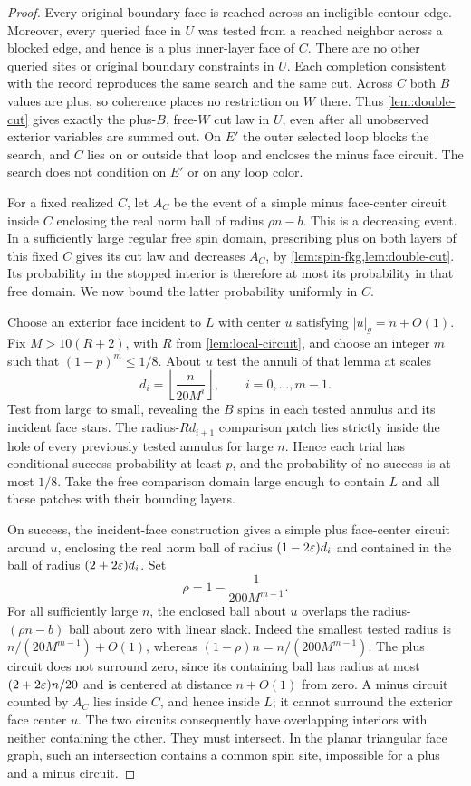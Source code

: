 \begin{proof}
Every original boundary face is reached across an ineligible contour
edge.  Moreover, every queried face in $U$ was tested from a reached
neighbor across a blocked edge, and hence is a plus inner-layer face of
$C$.  There are no other queried sites or original boundary constraints
in $U$.  Each completion consistent with the record reproduces the same
search and the same cut.  Across $C$ both $B$ values are plus, so coherence
places no restriction on $W$ there.  Thus \cref{lem:double-cut} gives
exactly the plus-$B$, free-$W$ cut law in $U$, even after all unobserved
exterior variables are summed out.  On $E'$ the outer selected loop
blocks the search, and $C$ lies on or outside that loop and encloses the
minus face circuit.
The search does not condition on $E'$ or on any loop color.

For a fixed realized $C$, let $A_C$ be the event of a simple minus
face-center circuit inside $C$ enclosing the real norm ball of radius
$\rho n-b$.  This is a decreasing event.  In a sufficiently large
regular free spin domain, prescribing plus on both layers of this fixed
$C$ gives its cut law and decreases $A_C$, by
\cref{lem:spin-fkg,lem:double-cut}.  Its probability in the stopped
interior is therefore at most its probability in that free domain.
We now bound the latter probability uniformly in $C$.

Choose an exterior face incident to $L$ with center $u$ satisfying
$|u|_g=n+O(1)$.  Fix $M>10(R+2)$, with $R$ from
\cref{lem:local-circuit}, and choose an integer $m$ such that
$(1-p)^m\le1/8$.  About $u$ test the annuli of that lemma at scales
\[
       d_i=\left\lfloor\frac{n}{20M^i}\right\rfloor,
                  \qquad i=0,\ldots,m-1.
\]
Test from large to small, revealing the $B$ spins in each tested annulus
and its incident face stars.  The radius-$Rd_{i+1}$ comparison patch
lies strictly inside the hole of every previously tested annulus for
large $n$.  Hence each trial has conditional success probability at
least $p$, and the probability of no success is at most $1/8$.
Take the free comparison domain large enough to contain $L$ and all
these patches with their bounding layers.

On success, the incident-face construction gives a simple plus
face-center circuit around $u$, enclosing the real norm ball of radius
$(1-2\varepsilon)d_i$ and contained in the ball of radius $(2+2\varepsilon)d_i$.
Set
\[
                       \rho=1-\frac{1}{200M^{m-1}}.
\]
For all sufficiently large $n$, the enclosed ball about $u$ overlaps
the radius-$(\rho n-b)$ ball about zero with linear slack.  Indeed the
smallest tested radius is $n/(20M^{m-1})+O(1)$, whereas
$(1-\rho)n=n/(200M^{m-1})$.  The plus circuit does not surround zero,
since its containing ball has radius at most $(2+2\varepsilon)n/20$ and is
centered at distance $n+O(1)$ from zero.  A minus circuit counted by $A_C$ lies inside $C$, and hence inside $L$;
it cannot surround the exterior face center $u$.
The two circuits consequently have overlapping interiors with neither
containing the other.  They must intersect.  In the planar triangular
face graph, such an intersection contains a common spin site, impossible
for a plus and a minus circuit.


\end{proof}
